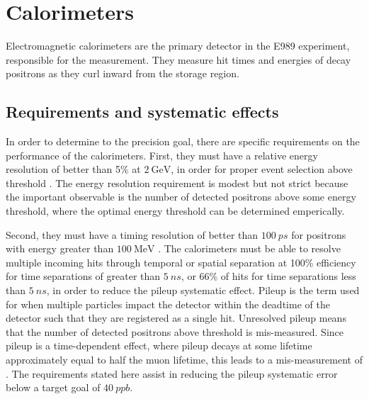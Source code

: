\section{Calorimeters}
\label{sec:Calorimeters}


Electromagnetic calorimeters are the primary detector in the E989 experiment, responsible for the \wa measurement. They measure hit times and energies of decay positrons as they curl inward from the storage region. 

\subsection{Requirements and systematic effects}
\label{sub:calosystematics}

In order to determine \wa to the precision goal, there are specific requirements on the performance of the calorimeters. First, they must have a relative energy resolution of better than 5\% at $\SI{2}{\GeV}$, in order for proper event selection above threshold \cite{TDR}. The energy resolution requirement is modest but not strict because the important observable is the number of detected positrons above some energy threshold, where the optimal energy threshold can be determined emperically.

Second, they must have a timing resolution of better than $\SI{100}{ps}$ for positrons with energy greater than $\SI{100}{\MeV}$ \cite{TDR}. The calorimeters must be able to resolve multiple incoming hits through temporal or spatial separation at 100\% efficiency for time separations of greater than $\SI{5}{ns}$, or 66\% of hits for time separations less than $\SI{5}{ns}$, in order to reduce the pileup systematic effect. Pileup is the term used for when multiple particles impact the detector within the deadtime of the detector such that they are registered as a single hit. Unresolved pileup means that the number of detected positrons above threshold is mis-measured. Since pileup is a time-dependent effect, where pileup decays at some lifetime approximately equal to half the muon lifetime, this leads to a mis-measurement of \wa. The requirements stated here assist in reducing the pileup systematic error below a target goal of $\SI{40}{ppb}$.


